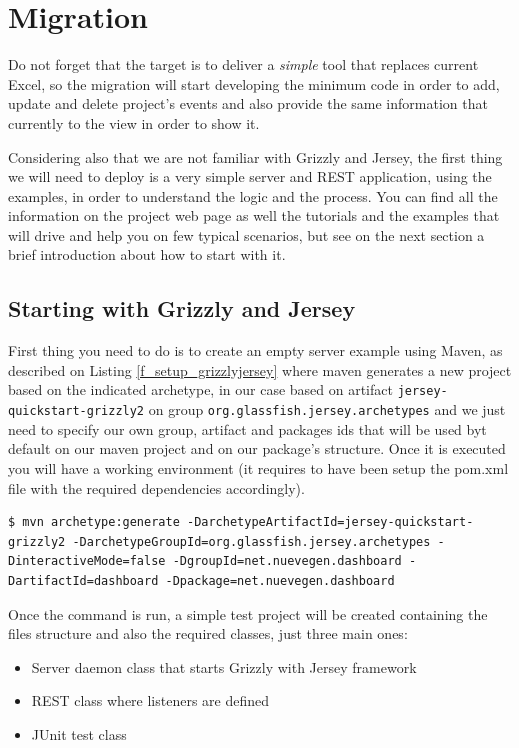 \chapter{Migration}
Do not forget that the target is to deliver a \emph{simple} tool that replaces
current Excel, so the migration will start developing the minimum code in order
to add, update and delete project's events and also provide the same
information that currently to the view in order to show it.

Considering also that we are not familiar with Grizzly and Jersey, the first
thing we will need to deploy is a very simple server and REST application,
using the examples, in order to understand the logic and the process. You can find all the
information on the project web page as well the tutorials and the examples that
will drive and help you on few typical scenarios, but see on the next section a
brief introduction about how to start with it.

\section{Starting with Grizzly and Jersey}
First thing you need to do is to create an empty server example using Maven,
as described on Listing \ref{f_setup_grizzlyjersey} where maven generates a new
project based on the indicated archetype, in our case based on artifact
\texttt{jersey-quickstart-grizzly2} on group
\texttt{org.glassfish.jersey.archetypes} and we just need to specify our own
group, artifact and packages ids that will be used byt default on our maven
project and on our package's structure. Once it is executed you will have a
working environment (it requires to have been setup the pom.xml file with the required dependencies accordingly).\\

\begin{lstlisting}[style=console,caption=Grizzly\ and\ Jersey\ First\ setup,label=f_setup_grizzlyjersey] 
$ mvn archetype:generate -DarchetypeArtifactId=jersey-quickstart-grizzly2 -DarchetypeGroupId=org.glassfish.jersey.archetypes -DinteractiveMode=false -DgroupId=net.nuevegen.dashboard -DartifactId=dashboard -Dpackage=net.nuevegen.dashboard 
\end{lstlisting}

Once the command is run, a simple test project will be created containing the
files structure and also the required classes, just three main ones: 
\begin{itemize}
  \item Server daemon class that starts Grizzly with Jersey framework
  \item REST class where listeners are defined
  \item JUnit test class
\end{itemize}


